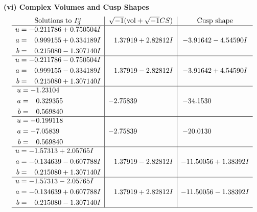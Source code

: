 \documentclass[1p]{elsarticle_modified}
\theoremstyle{definition}
\newcommand{\I}{\sqrt{-1}}
\begin{document}
\newpage\flushleft \textbf{(vi) Complex Volumes and Cusp Shapes}
$$\begin{array}{c|c|c}  
\text{Solutions to }I^u_{3}& \I (\text{vol} + \sqrt{-1}CS) & \text{Cusp shape}\\
 \hline 
\begin{aligned}
u &= -0.211786 + 0.750504 I \\
a &= \phantom{-}0.999155 + 0.334189 I \\
b &= \phantom{-}0.215080 - 1.307140 I\end{aligned}
 & \phantom{-}1.37919 + 2.82812 I & -3.91642 - 4.54590 I \\ \hline\begin{aligned}
u &= -0.211786 - 0.750504 I \\
a &= \phantom{-}0.999155 - 0.334189 I \\
b &= \phantom{-}0.215080 + 1.307140 I\end{aligned}
 & \phantom{-}1.37919 - 2.82812 I & -3.91642 + 4.54590 I \\ \hline\begin{aligned}
u &= -1.23104\phantom{ +0.000000I} \\
a &= \phantom{-}0.329355\phantom{ +0.000000I} \\
b &= \phantom{-}0.569840\phantom{ +0.000000I}\end{aligned}
 & -2.75839\phantom{ +0.000000I} & -34.1530\phantom{ +0.000000I} \\ \hline\begin{aligned}
u &= -0.199118\phantom{ +0.000000I} \\
a &= -7.05839\phantom{ +0.000000I} \\
b &= \phantom{-}0.569840\phantom{ +0.000000I}\end{aligned}
 & -2.75839\phantom{ +0.000000I} & -20.0130\phantom{ +0.000000I} \\ \hline\begin{aligned}
u &= -1.57313 + 2.05765 I \\
a &= -0.134639 - 0.607788 I \\
b &= \phantom{-}0.215080 + 1.307140 I\end{aligned}
 & \phantom{-}1.37919 - 2.82812 I & -11.50056 + 1.38392 I \\ \hline\begin{aligned}
u &= -1.57313 - 2.05765 I \\
a &= -0.134639 + 0.607788 I \\
b &= \phantom{-}0.215080 - 1.307140 I\end{aligned}
 & \phantom{-}1.37919 + 2.82812 I & -11.50056 - 1.38392 I\\
 \hline 
 \end{array}$$\newpage
\end{document}
